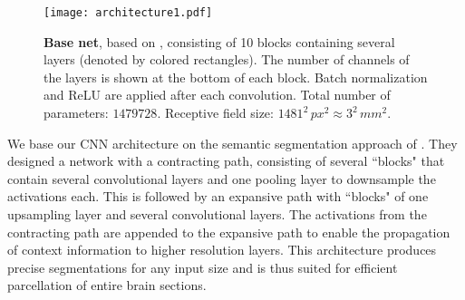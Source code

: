 \documentclass{article}
\begin{document}
\begin{figure}[t]
	\texttt{[image: architecture1.pdf]}
	\caption{
		\textbf{Base net}, based on \cite{ronneberger2015}, consisting of 10 blocks containing several layers (denoted by colored rectangles).
		The number of channels of the layers is shown at the bottom of each block.
		Batch normalization and ReLU are applied after each convolution.
		Total number of parameters: $1479728$. Receptive field size: $1481^2\,px^2 \approx 3^2\,mm^2$.
	}
	\label{fig:arch}
\end{figure}
%
We base our CNN architecture on the semantic segmentation approach of \cite{ronneberger2015}.
They designed a network with a contracting path, consisting of several ``blocks" that contain several convolutional layers and one pooling layer to downsample the activations each.
This is followed by an expansive path with ``blocks" of one upsampling layer and several convolutional layers.
The activations from the contracting path are appended to the expansive path to enable the propagation of context information to higher resolution layers.
This architecture produces precise segmentations for any input size and is thus suited for efficient parcellation of entire brain sections. %
\end{document}
